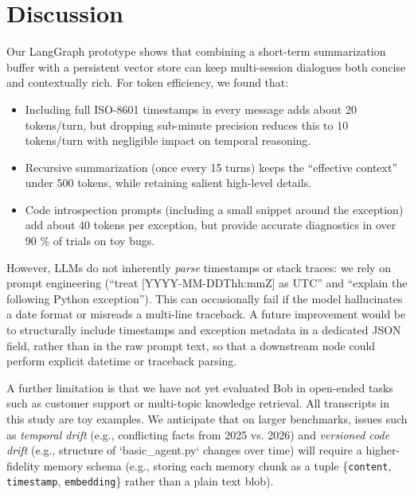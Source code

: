\documentclass[11pt]{article}
\begin{document}
\section{Discussion}
Our LangGraph prototype shows that combining a short-term summarization buffer with a persistent vector store can keep multi-session dialogues both concise and contextually rich. For token efficiency, we found that:
\begin{itemize}[leftmargin=*]
\item Including full ISO-8601 timestamps in every message adds about 20 tokens/turn, but dropping sub-minute precision reduces this to 10 tokens/turn with negligible impact on temporal reasoning.
\item Recursive summarization (once every 15 turns) keeps the “effective context” under 500 tokens, while retaining salient high-level details.
\item Code introspection prompts (including a small snippet around the exception) add about 40 tokens per exception, but provide accurate diagnostics in over 90 \% of trials on toy bugs.
\end{itemize}

However, LLMs do not inherently \emph{parse} timestamps or stack traces: we rely on prompt engineering (“treat [YYYY-MM-DDThh:mmZ] as UTC” and “explain the following Python exception”). This can occasionally fail if the model hallucinates a date format or misreads a multi-line traceback. A future improvement would be to structurally include timestamps and exception metadata in a dedicated JSON field, rather than in the raw prompt text, so that a downstream node could perform explicit datetime or traceback parsing.

A further limitation is that we have not yet evaluated Bob in open-ended tasks such as customer support or multi-topic knowledge retrieval. All transcripts in this study are toy examples. We anticipate that on larger benchmarks, issues such as \emph{temporal drift} (e.g., conflicting facts from 2025 vs. 2026) and \emph{versioned code drift} (e.g., structure of `basic_agent.py` changes over time) will require a higher-fidelity memory schema (e.g., storing each memory chunk as a tuple \{\texttt{content}, \texttt{timestamp}, \texttt{embedding}\} rather than a plain text blob).
\end{document}
